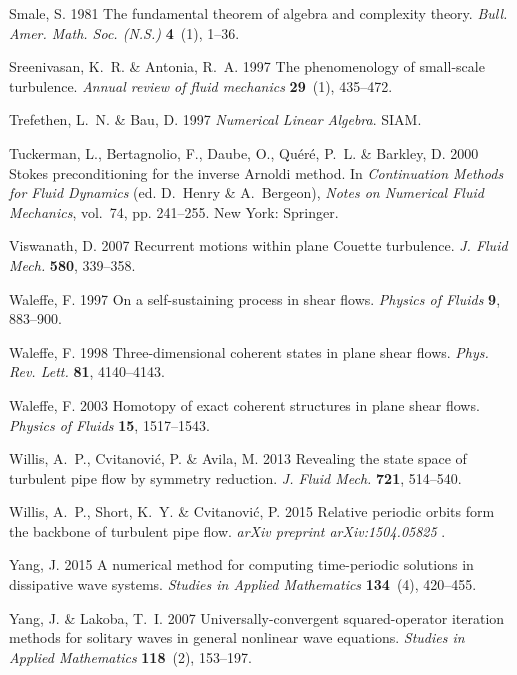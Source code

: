 \documentclass{jfm}
\begin{document}
\begin{thebibliography}{73}
{\sc Smale, S.} 1981 The fundamental theorem of algebra and complexity theory.
  {\em Bull. Amer. Math. Soc. (N.S.)\/} {\bf 4}~(1), 1--36.

{\sc Sreenivasan, K.~R. \& Antonia, R.~A.} 1997 The phenomenology of
  small-scale turbulence. {\em Annual review of fluid mechanics\/} {\bf
  29}~(1), 435--472.

{\sc Trefethen, L.~N. \& Bau, D.} 1997 {\em Numerical Linear Algebra\/}. SIAM.

{\sc Tuckerman, L., Bertagnolio, F., Daube, O., Qu\'er\'e, P.~L. \& Barkley,
  D.} 2000 Stokes preconditioning for the inverse {A}rnoldi method. In {\em
  Continuation Methods for Fluid Dynamics\/} (ed. D.~Henry \& A.~Bergeon), {\em
  Notes on Numerical Fluid Mechanics\/}, vol.~74, pp. 241--255. New York:
  Springer.

{\sc Viswanath, D.} 2007 Recurrent motions within plane {C}ouette turbulence.
  {\em J. Fluid Mech.\/} {\bf 580}, 339--358.

{\sc Waleffe, F.} 1997 On a self-sustaining process in shear flows. {\em
  Physics of Fluids\/} {\bf 9}, 883--900.

{\sc Waleffe, F.} 1998 Three-dimensional coherent states in plane shear flows.
  {\em Phys. Rev. Lett.\/} {\bf 81}, 4140--4143.

{\sc Waleffe, F.} 2003 Homotopy of exact coherent structures in plane shear
  flows. {\em Physics of Fluids\/} {\bf 15}, 1517--1543.

{\sc Willis, A.~P., Cvitanovi{\'c}, P. \& Avila, M.} 2013 Revealing the state
  space of turbulent pipe flow by symmetry reduction. {\em J. Fluid Mech.\/}
  {\bf 721}, 514--540.

{\sc Willis, A.~P., Short, K.~Y. \& Cvitanovi{\'c}, P.} 2015 Relative periodic
  orbits form the backbone of turbulent pipe flow. {\em arXiv preprint
  arXiv:1504.05825\/} .

{\sc Yang, J.} 2015 A numerical method for computing time-periodic solutions in
  dissipative wave systems. {\em Studies in Applied Mathematics\/} {\bf
  134}~(4), 420--455.

{\sc Yang, J. \& Lakoba, T.~I.} 2007 Universally-convergent squared-operator
  iteration methods for solitary waves in general nonlinear wave equations.
  {\em Studies in Applied Mathematics\/} {\bf 118}~(2), 153--197.
\end{thebibliography}
\end{document}
